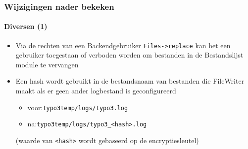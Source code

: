 
\begin{frame}[fragile]
	\frametitle{Wijzigingen nader bekeken}
	\framesubtitle{Diversen (1)}

	\lstset{basicstyle=\tiny\ttfamily}

	\begin{itemize}

		\item Via de rechten van een Backendgebruiker \texttt{Files->replace} kan het een gebruiker toegestaan of
			verboden worden om bestanden in de Bestandslijst module te vervangen


		\item Een hash wordt gebruikt in de bestandsnaam van bestanden die FileWriter maakt als er geen ander
			logbestand is geconfigureerd

			\begin{itemize}
				\item voor:\tabto{1.2cm}\texttt{typo3temp/logs/typo3.log}
				\item na:\tabto{1.2cm}\texttt{typo3temp/logs/typo3\_<hash>.log}
			\end{itemize}

			\small(waarde van \texttt{<hash>} wordt gebaseerd op de encryptiesleutel)\normalsize


	\end{itemize}

\end{frame}


